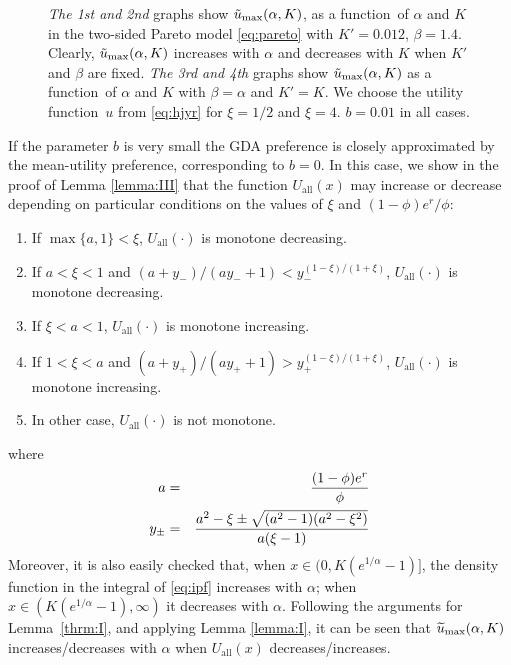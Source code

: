 \documentclass[11pt,a4]{amsart}
\newcommand{\wt}{\widetilde}
\newcommand{\fct}{function}
\newcommand{\1}{{\mathbf 1}}
\begin{document}
\begin{figure}[htb!]
\begin{minipage}{0.25\linewidth}
  \end{minipage}
  \caption{
   {\em The 1st and 2nd} graphs show
   $\tilde u_{\rm max}(\alpha, K)$, as a \fct\ of $\alpha$ and $K$
   in the two-sided Pareto model \eqref{eq:pareto} with $K'=0.012$,
   $\beta = 1.4$.
   Clearly, $\tilde u_{\rm max}(\alpha, K)$ increases with $\alpha$
   and decreases with $K$ when $K'$ and $\beta$ are fixed.
   {\em The 3rd and 4th} graphs show
   $\tilde u_{\rm max}(\alpha, K)$ as a \fct\ of $\alpha$
   and $K$ with $\beta = \alpha$ and $K' = K$.
   We choose the utility \fct\ $u$ from \eqref{eq:hjyr} for $\xi = 1/2$
   and $\xi = 4$. $b = 0.01$ in all cases.
  }
  \label{fig:preference_pareto}
\end{figure}

If the parameter $b$ is very small the GDA preference is closely
approximated by the mean-utility preference, corresponding to $b = 0$. 
In this case, we show in the proof of Lemma \ref{lemma:III} that the function
$U_{\text{all}}(x)$ may increase or decrease depending on particular conditions
on the values of $\xi$ and $(1 - \phi) e^r / \phi$:
\begin{enumerate}
\item If $\max\{a, 1\} < \xi$, $U_{\text{all}}(\cdot)$ is
  monotone decreasing.
\item If $a < \xi < 1$ and $(a + y_-)/(a y_- + 1) <
  y_-^{(1-\xi)/(1+\xi)}$, $U_{\text{all}}(\cdot)$ is monotone
  decreasing.
\item If $\xi < a < 1$, $U_{\text{all}}(\cdot)$ is monotone
  increasing.
\item If $1 < \xi < a$ and $(a + y_+)/(a y_+ + 1) >
  y_+^{(1-\xi)/(1+\xi)}$, $U_{\text{all}}(\cdot)$ is monotone
  increasing.
\item In other case, $U_{\text{all}}(\cdot)$ is not monotone.
\end{enumerate}
where
\begin{eqnarray*}
a &=& {
  (1 - \phi) e^r
  \over
  \phi
} \\
y_\pm &=& {
  a^2 - \xi \pm \sqrt{(a^2 - 1) (a^2 - \xi^2)}
  \over
  a (\xi - 1)
}
\end{eqnarray*}
Moreover, it is also easily checked that, when
$x \in (0, K(e^{1/\alpha} - 1)]$,
the density function in the integral of \eqref{eq:ipf} increases
with $\alpha$; when $x \in (K(e^{1/\alpha} - 1), \infty)$ it 
decreases with $\alpha$. Following the arguments for Lemma~\ref{thrm:I},
and applying Lemma \ref{lemma:I}, it can be seen that
$\wt u_{\rm max}(\alpha, K)$ increases/decreases with $\alpha$ when
$U_{\text{all}}(x)$  decreases/increases.
\end{document}
